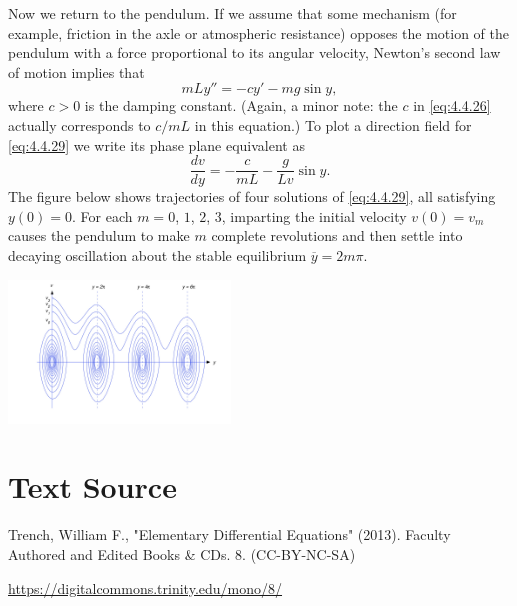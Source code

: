 \documentclass{ximera}
\begin{document}
\begin{example}\label{example:4.4.5}
Now we
return to the pendulum. If we assume that
some mechanism (for example, friction in the axle or atmospheric
resistance) opposes the motion of the pendulum with a force
proportional to its angular velocity,  Newton's second law of
motion implies that
\begin{equation} \label{eq:4.4.29}
mLy''=-cy'-mg\sin y,
\end{equation}
where $c>0$ is the damping constant. (Again, a minor note: the $c$
in \eqref{eq:4.4.26} actually corresponds to $c/mL$ in this equation.)
To plot a direction field for \eqref{eq:4.4.29} we write its phase plane
equivalent as
$$
\frac{dv}{dy}=-\frac{c}{mL}-\frac{g}{Lv}\sin y.
$$
The figure below shows
trajectories of four solutions of \eqref{eq:4.4.29}, all satisfying
$y(0)=0$. For each $m=0$, $1$, $2$, $3$, imparting the initial velocity
$v(0)=v_m$ causes the pendulum to make $m$ complete revolutions and
then settle into decaying oscillation about the stable equilibrium
$\overline{y}=2m\pi$.

\begin{image}
 \includegraphics[height=1.5in]{fig040415.jpg} 
\end{image}


\end{example}






\section*{Text Source}
Trench, William F., "Elementary Differential Equations" (2013). Faculty Authored and Edited Books \& CDs. 8. (CC-BY-NC-SA)

\href{https://digitalcommons.trinity.edu/mono/8/}{https://digitalcommons.trinity.edu/mono/8/}
\end{document}
